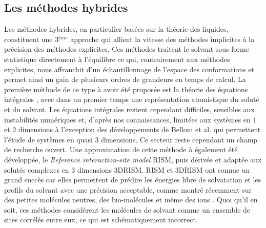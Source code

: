 \subsection{Les méthodes hybrides}
Les méthodes hybrides, en particulier basées sur la théorie des liquides, constituent une 3$^{ème}$ approche qui allient la vitesse des méthodes implicites à la précision des méthodes explicites. Ces méthodes traitent le solvant sous forme statistique directement à l'équilibre ce qui, contrairement aux méthodes explicites, nous affranchit d'un échantillonnage de l'espace des conformations et permet ainsi un gain de plusieurs ordres de grandeurs en temps de calcul. La première méthode de ce type à avoir été proposée est la théorie des équations intégrales \cite{hansen_theory_2006,gray_theory_1984,hirata_molecular_2003}, avec dans un premier temps une représentation atomistique du soluté et du solvant. Les équations intégrales restent cependant difficiles, sensibles aux instabilités numériques et, d'après nos connaissances, limitées aux systèmes en 1 et 2 dimensions à l'exception des développements de Belloni et al.\cite{Puibasset_bridge_2012, belloni_unpublished} qui permettent l'étude de systèmes en quasi 3 dimensions. Ce secteur reste cependant un champ de recherche ouvert. Une approximation de cette méthode à également été développée, le \textit{Reference interaction-site model} RISM\cite{chandler_optimized_1972}, puis dérivée et adaptée aux solutés complexes en 3 dimensions 3DRISM\cite{Chandler_censity_1986,Kovalenko_self_1999,beglov_integral_1997, du_solvation_2000,  luchko_three-dimensional_2010}. RISM et 3DRISM ont connue un grand succès car elles permettent de prédire les énergies libre de solvatation et les profils du solvant avec une précision acceptable, comme montré récemment sur des petites molécules neutres\cite{roy_predicting_2017, du_solvation_2000, kovalenko_potential_1999, kovalenko_hydration_2000, johnson_small_2016}, des bio-molécules \cite{sindhikara_analysis_2013,imai_hydration_2006,kiyota_new_2011,phongphanphanee_molecular_2010} et même des ions \cite{phongphanphanee_potential_2009, kovalenko_potentials_2000}. Quoi qu'il en soit, ces méthodes considèrent les molécules de solvant comme un ensemble de sites corrélés entre eux, ce qui est schématiquement incorrect.



